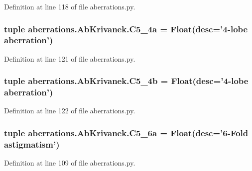 Definition at line 118 of file aberrations.\-py.

\hypertarget{classaberrations_1_1_ab_krivanek_a891846dfeba7bb569ca05988addbf780}{
\subsubsection[{C5\-\_\-4a}]{\setlength{\rightskip}{0pt plus 5cm}tuple aberrations.\-Ab\-Krivanek.\-C5\-\_\-4a = Float(desc='4-\/lobe {\bf aberration}')\hspace{0.3cm}{\ttfamily [static]}}}\label{classaberrations_1_1_ab_krivanek_a891846dfeba7bb569ca05988addbf780}


Definition at line 121 of file aberrations.\-py.

\hypertarget{classaberrations_1_1_ab_krivanek_a7ce620a43e01049640bdd0fac68fe76e}{
\subsubsection[{C5\-\_\-4b}]{\setlength{\rightskip}{0pt plus 5cm}tuple aberrations.\-Ab\-Krivanek.\-C5\-\_\-4b = Float(desc='4-\/lobe {\bf aberration}')\hspace{0.3cm}{\ttfamily [static]}}}\label{classaberrations_1_1_ab_krivanek_a7ce620a43e01049640bdd0fac68fe76e}


Definition at line 122 of file aberrations.\-py.

\hypertarget{classaberrations_1_1_ab_krivanek_ad0efb21c7be0f06d0d9bf9ef2126edb6}{
\subsubsection[{C5\-\_\-6a}]{\setlength{\rightskip}{0pt plus 5cm}tuple aberrations.\-Ab\-Krivanek.\-C5\-\_\-6a = Float(desc='6-\/Fold astigmatism')\hspace{0.3cm}{\ttfamily [static]}}}\label{classaberrations_1_1_ab_krivanek_ad0efb21c7be0f06d0d9bf9ef2126edb6}


Definition at line 109 of file aberrations.\-py.

